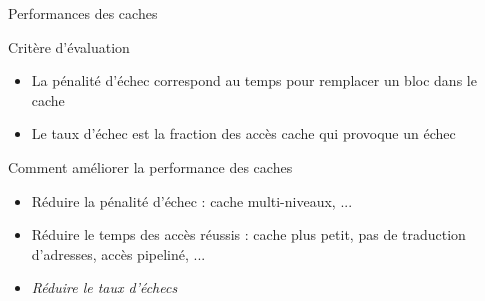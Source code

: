 %
\begin{Frame}{Performances des caches}


      \begin{block}{Critère d'évaluation}
       \begin{center}
 	\begin{itemize}
         \item La pénalité d'échec correspond au temps pour remplacer un bloc dans le cache
         \item Le taux d'échec est la fraction des accès cache qui provoque un échec
        \end{itemize}
       \end{center}
      \end{block}   

  


  

  \begin{block}{Comment améliorer la performance des caches}
    \begin{center}
 	\begin{itemize}
        \item Réduire la pénalité d'échec : cache multi-niveaux, ...
        \item Réduire le temps des accès réussis : cache plus petit, pas de traduction d'adresses, accès pipeliné, ...
	\item \emph{Réduire le taux d'échecs}
        \end{itemize}
    \end{center}
  \end{block}   

 

\end{Frame}



